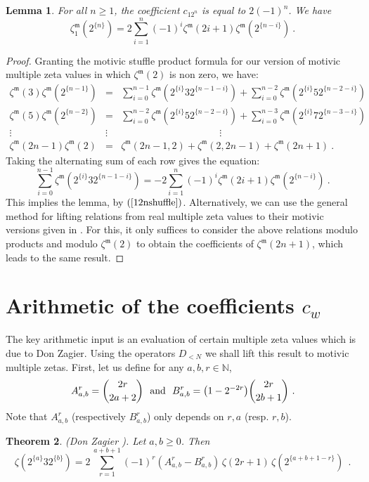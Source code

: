 \documentclass[10pt]{amsart}
\newtheorem{thm}{Theorem}[section]
\newtheorem{lem}[thm]{Lemma}
\theoremstyle{definition}
\theoremstyle{remark}
\numberwithin{equation}{section}
\newcommand{\N}{\mathbb N}
\newcommand{\zetam}{\zeta^{ \mathfrak{m}}}
\begin{document}
\begin{lem} \label{lem010} For all $n\geq 1$,   the coefficient $c_{12^n}$ is equal to  $2(-1)^n$.  We have
$$
 \zetam_1(2^{\{n\}}) = 2 \sum_{i=1}^{n}  (-1)^i \zetam(2i+1) \zetam(2^{\{n-i\}})\ .
$$
\end{lem}
\begin{proof}
Granting the motivic stuffle product formula  \cite{Rac,Soud} for our version of  motivic multiple zeta values  in which $\zetam(2)$ is non zero, we have:
 \begin{eqnarray}
 \zetam(3)\zetam(2^{\{n-1\}})  &=  &\sum_{i=0}^{n-1} \zetam(2^{\{i\}}32^{\{n-1-i\}}) + \sum_{i=0}^{n-2} \zetam(2^{\{i\}} 5 2^{\{n-2-i\}}) \nonumber \\
 \zetam(5)\zetam(2^{\{n-2\}})  &=  &\sum_{i=0}^{n-2} \zetam(2^{\{i\}}52^{\{n-2-i\}}) + \sum_{i=0}^{n-3} \zetam(2^{\{i\}} 7 2^{\{n-3-i\}}) \nonumber \\
 \vdots \qquad \qquad & \vdots & \qquad \qquad \qquad\qquad \qquad \vdots \nonumber \\
 \zetam(2n-1)\zetam(2) & = & \zetam(2n-1,2)+\zetam(2,2n-1) + \zetam(2n+1) \ .\nonumber
 \end{eqnarray} 
  Taking the alternating sum of each row  gives the equation: 
 $$\sum_{i=0}^{n-1} \zetam(2^{\{i\}}32^{\{n-1-i\}}) = -2 \sum_{i=1}^{n}  (-1)^i \zetam(2i+1) \zetam(2^{\{n-i\}})  \ .$$
This implies the lemma, by $(\ref{12nshuffle})$.
  Alternatively,  we can   use the general  method for lifting relations from real multiple zeta values to their motivic versions given in  \cite{Br}. For this, it  only suffices to consider
 the above relations modulo products and modulo $\zetam(2)$ to obtain the coefficients of $\zetam(2n+1)$, which leads to  the same result.
 \end{proof}


\section{Arithmetic of the coefficients $c_w$} \label{sect4}
The key arithmetic input  is an evaluation of certain multiple zeta values  which is due to Don Zagier.
Using the operators $D_{<N}$ we shall lift this result to motivic multiple zetas.
 First, let us define for any $a,b,r\in \N$, 
$$A^r_{a,b} =  \binom{2r}{2a+2} \  \hbox{ and  } \ B^r_{a,b} =\bigl(1-2^{-2r}\bigr)\binom{2r}{2b+1}\ . $$
Note that $A^r_{a,b}$ (respectively $B^r_{a,b}$) only depends on $r,a$ (resp. $r,b$).

\begin{thm} \label{thmZagierthm} (Don Zagier \cite{Zagier}).  Let $a,b\geq 0$. Then 
$$\zeta(2^{\{a\}}32^{\{b\}})=  2\,\sum_{r=1}^{a+b+1}(-1)^r (A^r_{a,b}-B^r_{a,b})\, \zeta(2r+1)\, \zeta(2^{\{a+b+1-r\}})\,\;. $$
\end{thm}
 
\end{document}
